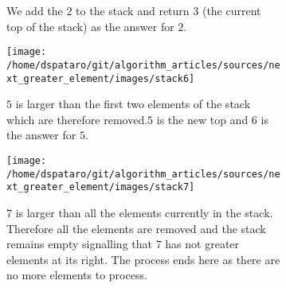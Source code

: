 \begin{figure}
\begin{subfigure}[t]{0.49\textwidth}
\begin{framed}
		\end{framed}
		\caption{We add the $2$ to the stack and return $3$ (the current top of the stack) as the answer for $2$.}
		\label{fig:next_greater:variation1:stack1}
	 \end{subfigure}
	 \hfill
	 \begin{subfigure}[t]{0.49\textwidth}
		\begin{framed}
			\texttt{[image: /home/dspataro/git/algorithm\_articles/sources/next\_greater\_element/images/stack6]}
		\end{framed}
		\caption{$5$ is larger than the first two elements of the stack which are therefore removed.$5$ is the new top and $6$ is the answer for $5$. }
		\label{fig:next_greater:variation1:stack1}
	 \end{subfigure}
	 \hfill
	 \begin{subfigure}[t]{0.49\textwidth}
		\begin{framed}
			\texttt{[image: /home/dspataro/git/algorithm\_articles/sources/next\_greater\_element/images/stack7]}
		\end{framed}
		\caption{$7$ is larger than all the elements currently in the stack. Therefore all the elements are removed and the stack remains empty signalling that $7$ has not greater elements at its right. The process ends here as there are no more elements to process.}
		\label{fig:next_greater:variation1:stack1}
	 \end{subfigure}
	 \caption[]{}
	  \label{fig:next_greater:stack}
\end{figure}